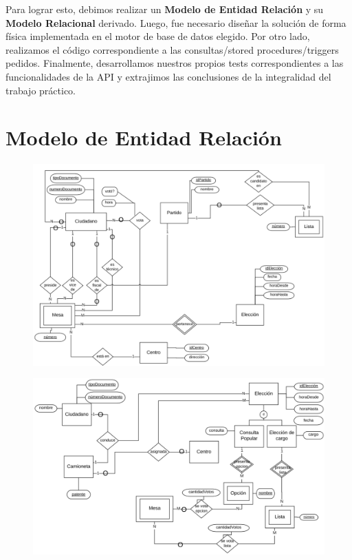 \documentclass[10pt,a4paper]{article}
\begin{document}
Para lograr esto, debimos realizar un \textbf{Modelo de Entidad Relación} y su \textbf{Modelo Relacional} derivado. Luego, fue necesario diseñar la solución de forma física implementada en el motor de base de datos elegido. Por otro lado, realizamos el código correspondiente a las consultas/stored procedures/triggers pedidos. Finalmente, desarrollamos nuestros propios tests correspondientes a las funcionalidades de la API y extrajimos las conclusiones de la integralidad del trabajo práctico.

\newpage
\section{Modelo de Entidad Relación}

\begin{figure}[H] %
\begin{center}
\includegraphics[width=470pt]{./diagramas/DER01.png}
\end{center}
\end{figure}

\begin{figure}[H] %
\begin{center}
\includegraphics[width=470pt]{./diagramas/DER02.png}
\end{center}
\end{figure}
\end{document}
